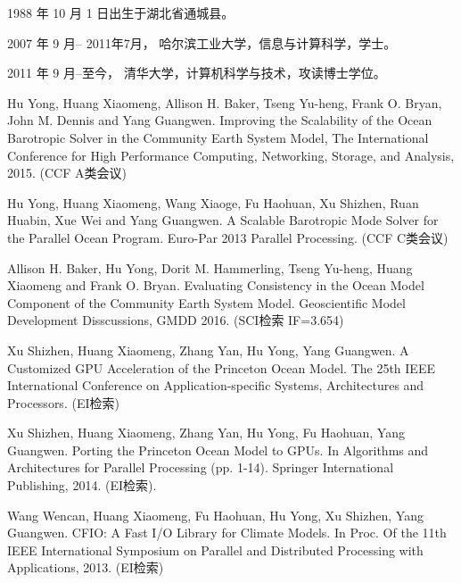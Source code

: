 \begin{resume}


  1988 年 10 月 1 日出生于湖北省通城县。

  2007 年 9 月-- 2011年7月， 哈尔滨工业大学，信息与计算科学，学士。

  2011 年 9 月--至今， 清华大学，计算机科学与技术，攻读博士学位。


  \begin{publications}
    \item Hu Yong, Huang Xiaomeng, Allison H. Baker, Tseng Yu-heng, Frank O. Bryan, John M. Dennis and Yang Guangwen. Improving the Scalability of the Ocean Barotropic Solver in the Community Earth System Model, The International Conference for High Performance Computing, Networking, Storage, and Analysis, 2015.  (CCF A类会议)
    \item  Hu Yong, Huang Xiaomeng, Wang Xiaoge, Fu Haohuan, Xu Shizhen, Ruan Huabin, Xue Wei and Yang Guangwen. A Scalable Barotropic Mode Solver for the Parallel Ocean Program. Euro-Par 2013 Parallel Processing. (CCF C类会议) 
  \end{publications}

  \begin{publications}[before=\publicationskip,after=\publicationskip]
    \item Allison H. Baker, Hu Yong, Dorit M. Hammerling, Tseng Yu-heng, Huang Xiaomeng and Frank O. Bryan. Evaluating Consistency in the Ocean Model Component of the Community Earth System Model. Geoscientific Model Development Disscussions, GMDD 2016. (SCI检索 IF=3.654)
  \end{publications}

  \begin{publications}
    \item Xu Shizhen, Huang Xiaomeng, Zhang Yan, Hu Yong, Yang Guangwen. A Customized GPU Acceleration of the Princeton Ocean Model. The 25th IEEE International Conference on Application-specific Systems, Architectures and Processors. (EI检索)
     \item  Xu Shizhen, Huang Xiaomeng, Zhang Yan, Hu Yong, Fu Haohuan,  Yang Guangwen. Porting the Princeton Ocean Model to GPUs. In Algorithms and Architectures for Parallel Processing (pp. 1-14). Springer International Publishing, 2014. (EI检索).
    \item Wang Wencan, Huang Xiaomeng, Fu Haohuan, Hu Yong, Xu Shizhen, Yang Guangwen. CFIO: A Fast I/O Library for Climate Models. In Proc. Of the 11th IEEE International Symposium on Parallel and Distributed Processing with Applications, 2013. (EI检索)
    

\end{publications}
\end{resume}
